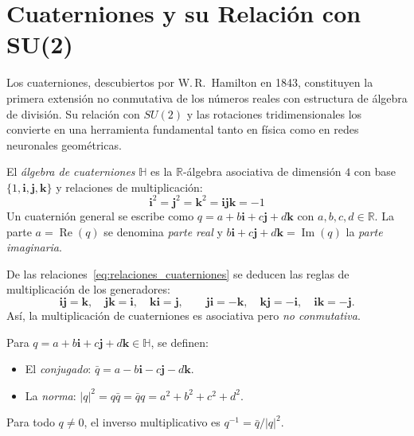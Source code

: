 \section{Cuaterniones y su Relación con SU(2)}\label{sec:cuaterniones}

Los cuaterniones, descubiertos por W.\,R.\ Hamilton en 1843, constituyen la primera extensión no conmutativa de los números reales con estructura de álgebra de división. Su relación con $SU(2)$ y las rotaciones tridimensionales los convierte en una herramienta fundamental tanto en física como en redes neuronales geométricas.

\begin{definition}\label{def:cuaterniones}
El \textit{álgebra de cuaterniones} $\mathbb{H}$ es la $\mathbb{R}$-álgebra asociativa de dimensión $4$ con base $\{1, \mathbf{i}, \mathbf{j}, \mathbf{k}\}$ y relaciones de multiplicación:
\begin{equation}\label{eq:relaciones_cuaterniones}
\mathbf{i}^2 = \mathbf{j}^2 = \mathbf{k}^2 = \mathbf{i}\mathbf{j}\mathbf{k} = -1
\end{equation}
Un cuaternión general se escribe como $q = a + b\mathbf{i} + c\mathbf{j} + d\mathbf{k}$ con $a, b, c, d \in \mathbb{R}$. La parte $a = \operatorname{Re}(q)$ se denomina \textit{parte real} y $b\mathbf{i} + c\mathbf{j} + d\mathbf{k} = \operatorname{Im}(q)$ la \textit{parte imaginaria}.
\end{definition}

De las relaciones~\eqref{eq:relaciones_cuaterniones} se deducen las reglas de multiplicación de los generadores:
\[
\mathbf{i}\mathbf{j} = \mathbf{k}, \quad \mathbf{j}\mathbf{k} = \mathbf{i}, \quad \mathbf{k}\mathbf{i} = \mathbf{j}, \qquad \mathbf{j}\mathbf{i} = -\mathbf{k}, \quad \mathbf{k}\mathbf{j} = -\mathbf{i}, \quad \mathbf{i}\mathbf{k} = -\mathbf{j}.
\]
Así, la multiplicación de cuaterniones es asociativa pero \emph{no conmutativa}.

\begin{definition}\label{def:conjugacion_norma_cuaterniones}
Para $q = a + b\mathbf{i} + c\mathbf{j} + d\mathbf{k} \in \mathbb{H}$, se definen:
\begin{itemize}
    \item El \textit{conjugado}: $\bar{q} = a - b\mathbf{i} - c\mathbf{j} - d\mathbf{k}$.
    \item La \textit{norma}: $|q|^2 = q\bar{q} = \bar{q}q = a^2 + b^2 + c^2 + d^2$.
\end{itemize}
Para todo $q \neq 0$, el inverso multiplicativo es $q^{-1} = \bar{q}/|q|^2$.
\end{definition}

